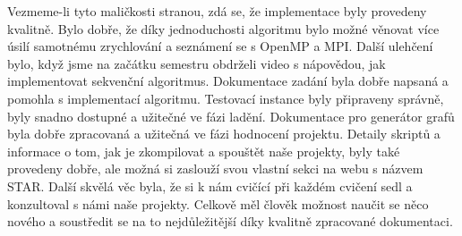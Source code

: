 Vezmeme-li tyto maličkosti stranou, zdá se, že implementace byly provedeny kvalitně.
Bylo dobře, že díky jednoduchosti algoritmu bylo možné věnovat více úsilí samotnému zrychlování a seznámení se s OpenMP a MPI.
Další ulehčení bylo, když jsme na začátku semestru obdrželi video s nápovědou, jak implementovat sekvenční algoritmus.
Dokumentace zadání byla dobře napsaná a pomohla s implementací algoritmu.
Testovací instance byly připraveny správně, byly snadno dostupné a užitečné ve fázi ladění.
Dokumentace pro generátor grafů byla dobře zpracovaná a užitečná ve fázi hodnocení projektu.
Detaily skriptů a informace o tom, jak je zkompilovat a spouštět naše projekty, byly také provedeny dobře, ale možná si zaslouží svou vlastní sekci na webu s názvem STAR.
Další skvělá věc byla, že si k nám cvičící při každém cvičení sedl a konzultoval s námi naše projekty.
Celkově měl člověk možnost naučit se něco nového a soustředit se na to nejdůležitější díky kvalitně zpracované dokumentaci.
